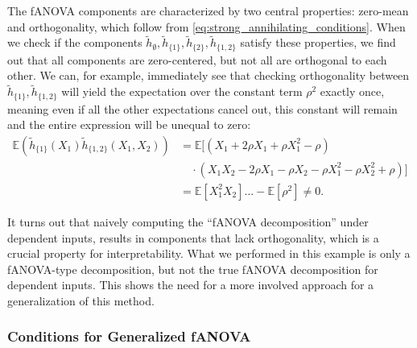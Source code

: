 The fANOVA components are characterized by two central properties: zero-mean and orthogonality, which follow from \autoref{eq:strong_annihilating_conditions}.
When we check if the components $\tilde{h}_{\emptyset}, \tilde{h}_{\{1\}}, \tilde{h}_{\{2\}}, \tilde{h}_{\{1,2\}}$ satisfy these properties, we find out that all components are zero-centered, but not all are orthogonal to each other. We can, for example, immediately see that checking orthogonality between $\tilde{h}_{\{1\}}, \tilde{h}_{\{1,2\}}$ will yield the expectation over the constant term $\rho^2$ exactly once, meaning even if all the other expectations cancel out, this constant will remain and the entire expression will be unequal to zero:
\begin{align*}
    \mathbb{E}(\tilde{h}_{\{1\}}(X_1)\tilde{h}_{\{1,2\}}(X_1, X_2)) 
    &= \mathbb{E}[(X_1 + 2\rho X_1 + \rho X_1^2 - \rho) \\
    &\quad \cdot (X_1 X_2 - 2\rho X_1 - \rho X_2 - \rho X_1^2 - \rho X_2^2 + \rho)] \\
    &= \mathbb{E}[X_{1}^2X_2] \ldots - \mathbb{E}[\rho^2] \neq 0.
\end{align*}

It turns out that naively computing the ``fANOVA decomposition'' under dependent inputs, results in components that lack orthogonality, which is a crucial property for interpretability.
What we performed in this example is only a fANOVA-type decomposition, but not the true fANOVA decomposition for dependent inputs.
This shows the need for a more involved approach for a generalization of this method.

\subsubsection{Conditions for Generalized fANOVA}

